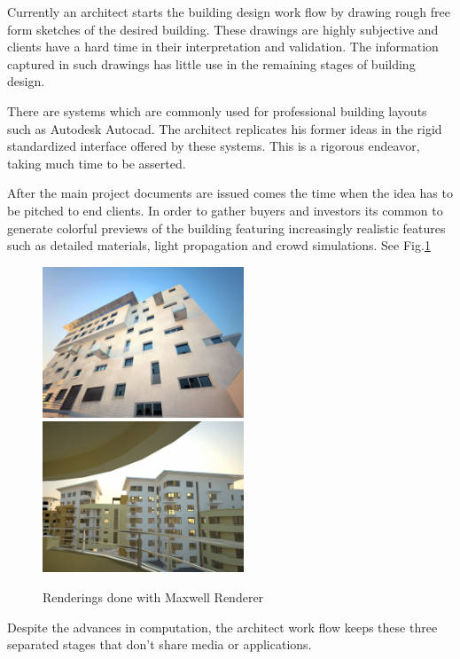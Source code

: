 Currently an architect starts the building design work flow by drawing rough
free form sketches of the desired building. These drawings are highly subjective
and clients have a hard time in their interpretation and validation.
The information captured in such drawings has little use in the remaining stages
of building design.


There are systems which are commonly used for professional building layouts
such as Autodesk Autocad.
The architect replicates his former ideas in the rigid standardized interface
offered by these systems. This is a rigorous endeavor, taking much time to be asserted.

After the main project documents are issued comes the time when the idea has to
be pitched to end clients.
In order to gather buyers and investors its common to generate colorful previews of the building featuring increasingly realistic features such as detailed materials, light propagation and crowd simulations. See
Fig.\ref{FIG-REALISTIC}

\begin{figure}[!ht]
	\centering
	\includegraphics[width=6cm]{gfx/realistic01.jpg}
	\includegraphics[width=6cm]{gfx/realistic03.jpg}
	\caption{Renderings done with Maxwell Renderer}
	\label{FIG-REALISTIC}
\end{figure}


Despite the advances in computation, the architect work flow keeps these three separated stages
that don't share media or applications.

